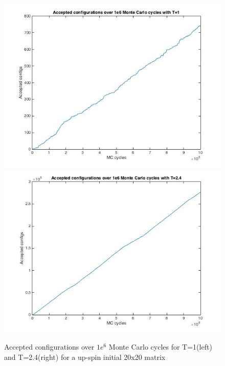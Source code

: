 \documentclass[10pt,a4paper]{article}
\begin{document}
\begin{figure}[H]
\centerline{
\includegraphics[scale=0.4]{acc20_1e6mc_T=1_up}
\includegraphics[scale=0.4]{acc20_1e6mc_T=24_up}
}
\caption{Accepted configurations over $1e^6$ Monte Carlo cycles for T=1(left) and T=2.4(right) for a up-spin initial 20x20 matrix}
\label{fig:configs_20_1e6_up}
\end{figure}
\end{document}
